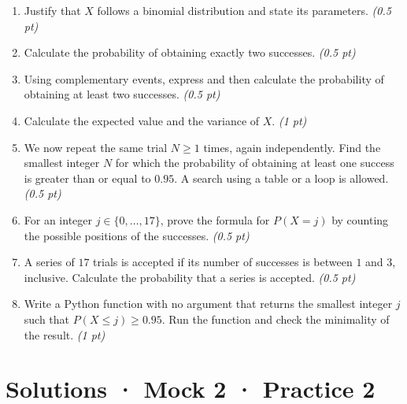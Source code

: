\begin{enumerate}

\item Justify that $X$ follows a binomial distribution and state its parameters. \hfill\textit{(0.5 pt)}

\item Calculate the probability of obtaining exactly two successes. \hfill\textit{(0.5 pt)}

\item Using complementary events, express and then calculate the probability of obtaining at least two successes. \hfill\textit{(0.5 pt)}

\item Calculate the expected value and the variance of $X$. \hfill\textit{(1 pt)}

\item We now repeat the same trial $N\ge1$ times, again independently. Find the smallest integer $N$ for which the probability of obtaining at least one success is greater than or equal to $0.95$. A search using a table or a loop is allowed. \hfill\textit{(0.5 pt)}

\item For an integer $j\in\{0,\ldots,17\}$, prove the formula for $P(X=j)$ by counting the possible positions of the successes. \hfill\textit{(0.5 pt)}

\item A series of $17$ trials is accepted if its number of successes is between $1$ and $3$, inclusive. Calculate the probability that a series is accepted. \hfill\textit{(0.5 pt)}

\item Write a Python function with no argument that returns the smallest integer $j$ such that $P(X\le j)\ge0.95$. Run the function and check the minimality of the result. \hfill\textit{(1 pt)}

\end{enumerate}

\ifprof\clearpage

\section*{Solutions · Mock 2 · Practice 2}\label{cor:8-2}

